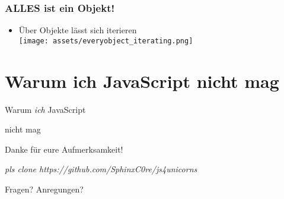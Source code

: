 \documentclass{beamer}
\begin{document}

\begin{frame}
\frametitle{ALLES ist ein Objekt!}
\begin{itemize}
\item Über Objekte lässt sich iterieren
\\
\texttt{[image: assets/everyobject\_iterating.png]}
\end{itemize}
\end{frame}


\section{Warum ich JavaScript nicht mag}

\begin{frame}
\Huge{
\centerline{Warum \textit{ich} JavaScript}
\centerline{nicht mag}
}
\end{frame}


\begin{frame}
\Huge{\centerline{Danke für eure Aufmerksamkeit!}}
\begin{small}
\textit{pls clone https://github.com/SphinxC0re/js4unicorns}
\end{small}
\end{frame}

\begin{frame}
\Huge{\centerline{Fragen? Anregungen?}}
\end{frame}

\end{document}
